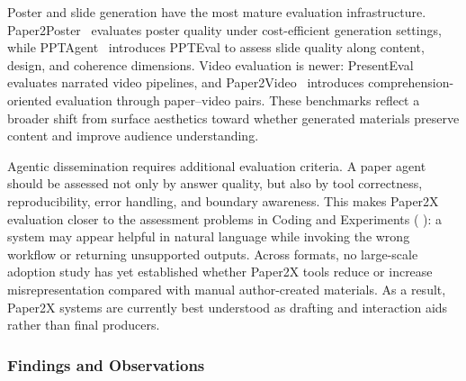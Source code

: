\documentclass{llmxive}
\providecommand{\levelbadge}[2]{  \tcbox[on line, nobeforeafter, tcbox raise base,
         boxsep=0pt, left=2pt, right=2pt, top=0.5pt, bottom=0.5pt,
         arc=1.5pt, boxrule=0.3pt,
         colback=#1!15, colframe=#1!70]    {\scriptsize\bfseries\sffamily#2}}
\providecommand{\Sthree}{\texorpdfstring{\levelbadge{S3color}{S3}}{S3}\xspace}
\begin{document}
Poster and slide generation have the most mature evaluation infrastructure. Paper2Poster~\cite{paper2poster2025} evaluates poster quality under cost-efficient generation settings, while PPTAgent~\cite{pptagent2025} introduces PPTEval to assess slide quality along content, design, and coherence dimensions. Video evaluation is newer: PresentEval~\cite{presentagent2025} evaluates narrated video pipelines, and Paper2Video~\cite{paper2video2025} introduces comprehension-oriented evaluation through paper--video pairs. These benchmarks reflect a broader shift from surface aesthetics toward whether generated materials preserve content and improve audience understanding.

Agentic dissemination requires additional evaluation criteria. A paper agent should be assessed not only by answer quality, but also by tool correctness, reproducibility, error handling, and boundary awareness. This makes Paper2X evaluation closer to the assessment problems in Coding and Experiments (\Sthree): a system may appear helpful in natural language while invoking the wrong workflow or returning unsupported outputs. Across formats, no large-scale adoption study has yet established whether Paper2X tools reduce or increase misrepresentation compared with manual author-created materials. As a result, Paper2X systems are currently best understood as drafting and interaction aids rather than final producers.



\subsubsection{Findings and Observations}
\label{sec:s8_findings}
\end{document}
